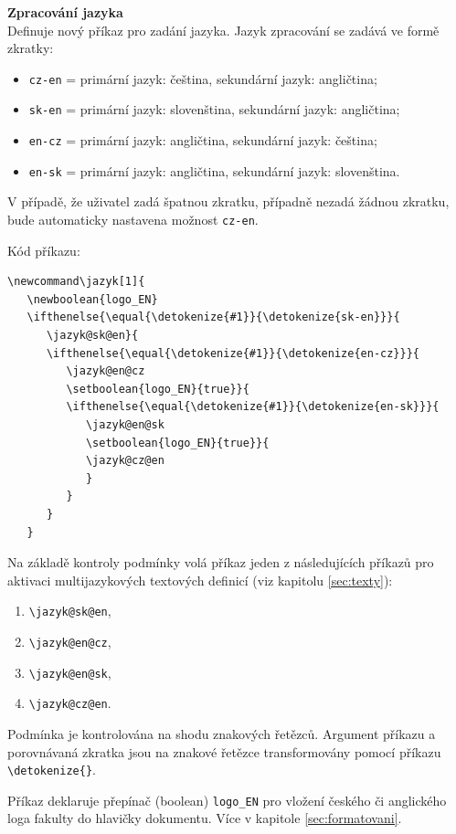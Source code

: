 \vspace{8pt}
\textbf{Zpracování jazyka}\\
Definuje nový příkaz pro zadání jazyka. Jazyk zpracování se zadává ve formě zkratky:

\begin{itemize}[label={-}]
	\item \verb|cz-en| = primární jazyk: čeština, sekundární jazyk: angličtina;
	\item \verb|sk-en| = primární jazyk: slovenština, sekundární jazyk: angličtina;
	\item \verb|en-cz| = primární jazyk: angličtina, sekundární jazyk: čeština;
	\item \verb|en-sk| = primární jazyk: angličtina, sekundární jazyk: slovenština.
\end{itemize}

V případě, že uživatel zadá špatnou zkratku, případně nezadá žádnou zkratku, bude automaticky nastavena možnost \verb|cz-en|.

Kód příkazu:

\begin{verbatim}
\newcommand\jazyk[1]{
   \newboolean{logo_EN}	
   \ifthenelse{\equal{\detokenize{#1}}{\detokenize{sk-en}}}{
      \jazyk@sk@en}{
      \ifthenelse{\equal{\detokenize{#1}}{\detokenize{en-cz}}}{
         \jazyk@en@cz
         \setboolean{logo_EN}{true}}{
         \ifthenelse{\equal{\detokenize{#1}}{\detokenize{en-sk}}}{
            \jazyk@en@sk
            \setboolean{logo_EN}{true}}{
            \jazyk@cz@en
            }
         }
      }
   }
\end{verbatim}

Na základě kontroly podmínky volá příkaz jeden z následujících příkazů pro aktivaci multijazykových textových definicí (viz kapitolu \ref{sec:texty}):

\begin{enumerate}
	\item \verb|\jazyk@sk@en|,
	\item \verb|\jazyk@en@cz|,
	\item \verb|\jazyk@en@sk|,
	\item \verb|\jazyk@cz@en|.
\end{enumerate}

Podmínka je kontrolována na shodu znakových řetězců. Argument příkazu a porovnávaná zkratka jsou na znakové řetězce transformovány pomocí příkazu \verb|\detokenize{}|.

Příkaz deklaruje přepínač (boolean) \verb|logo_EN| pro vložení českého či anglického loga fakulty do hlavičky dokumentu. Více v kapitole \ref{sec:formatovani}.

